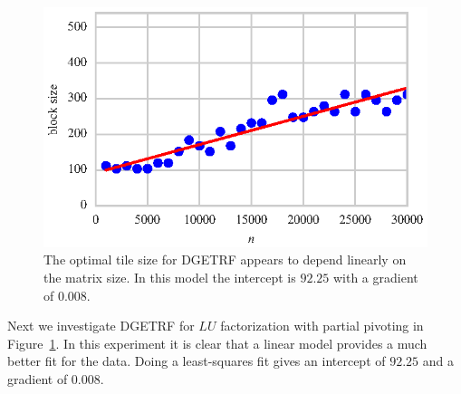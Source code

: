 \documentclass[a4paper,12pt]{article}
\begin{document}
\begin{figure}[ht]
  \centering
  \includegraphics[scale=1]{fig/curvefit_linear.eps}
  \caption{The optimal tile size for DGETRF appears to depend
    linearly on the matrix size. In this model the intercept is
    $92.25$ with a gradient of $0.008$.}
  \label{fig.fit_linear}
\end{figure}
Next we investigate DGETRF for $LU$ factorization
with partial pivoting in Figure~\ref{fig.fit_linear}.
In this experiment it is clear that a linear model
provides a much better fit for the data.
Doing a least-squares fit gives an intercept of $92.25$
and a gradient of $0.008$.
\end{document}
